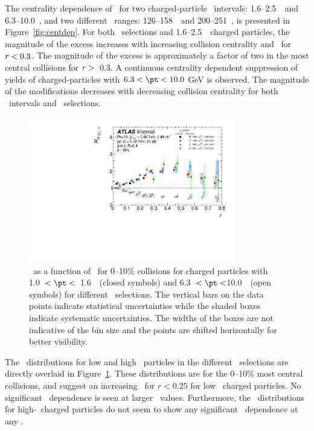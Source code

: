 The centrality dependence of \RDptr\ for two charged-particle \pt\ intervals: 1.6--2.5~\GeV\ and \mbox{6.3--10.0~\GeV}, and two different \ptjet\ ranges: 126--158~\GeV\ and 200--251~\GeV, is presented in Figure~\ref{fig:centdep}. 
For both \ptjet\ selections and  1.6--2.5~\GeV\ charged particles, the magnitude of the excess increases
with increasing collision centrality and \rvar\ for $\mbox{$r$} < 0.3$.  The magnitude of the excess is
approximately a factor of two in the most central collisions for $\mbox{$r$} >$~0.3.
A continuous centrality dependent suppression of  yields of charged-particles with $6.3 < \pt < 10.0$ GeV is observed.
The magnitude of the modifications decreases with decreasing collision centrality for both \pt\ 
intervals and \ptjet\ selections.

\begin{figure}[ht]
\centerline{
\includegraphics[width=0.8\textwidth]{figures/results/RDpT_dR_trk3_trk6_cent0.pdf} 
}
\caption{\RDptr\ as a function of \rvar\ for 0--10\% collisions for charged particles with 1.0~$< \pt <$~1.6~\GeV\
(closed symbols) and 6.3~$< \pt <$10.0~\GeV\ (open symbols) for different \ptjet\ selections. The vertical bars on the data points indicate statistical uncertainties while the shaded boxes indicate systematic uncertainties. The widths of the boxes are not indicative of the bin size and the points are shifted horizontally for better visibility.}
\label{fig:ptjetdep}
\end{figure}


The \RDptr\ distributions for low and high \pt\ particles in the different \ptjet\ selections are directly overlaid in Figure~\ref{fig:ptjetdep}. These distributions are for the 0--10\% 
most central collisions, and suggest an increasing \ptjet\  for $r < 0.25$ for low 
\pt\ charged particles. No significant \ptjet\ dependence is seen at larger \rvar\ values. Furthermore, the \RDptr\ distributions for high-\pt\ charged particles do not seem to show any significant \ptjet\ dependence at any \rvar.


